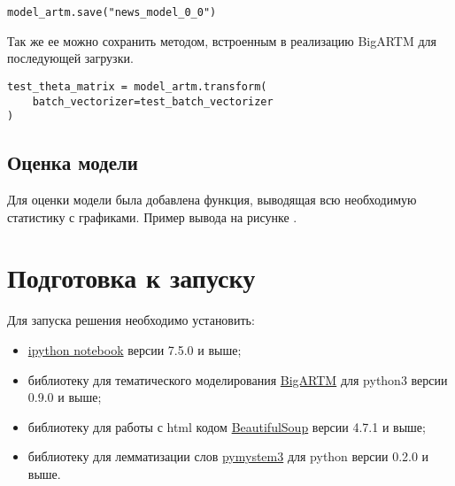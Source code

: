 \begin{lstlisting}
model_artm.save("news_model_0_0")
\end{lstlisting}

Так же ее можно сохранить методом, встроенным в реализацию BigARTM для последующей загрузки.

\begin{lstlisting}
test_theta_matrix = model_artm.transform(
    batch_vectorizer=test_batch_vectorizer
)
\end{lstlisting}

\subsection{Оценка модели}

Для оценки модели была добавлена функция, выводящая всю необходимую статистику с графиками. Пример вывода на рисунке \todo{}.

%
\section{Подготовка к запуску}

Для запуска решения необходимо установить:

\begin{itemize}
    \item \href{https://ipython.readthedocs.io/en/stable/}{ipython notebook} версии 7.5.0 и выше;
    \item библиотеку для тематического моделирования \href{https://bigartm.readthedocs.io/en/stable/installation/index.html}{BigARTM} для python3 версии 0.9.0 и выше;
    \item библиотеку для работы с html кодом \href{https://www.crummy.com/software/BeautifulSoup/}{BeautifulSoup} версии 4.7.1 и выше;
    \item библиотеку для лемматизации слов \href{https://pypi.org/project/pymystem3/}{pymystem3} для python версии 0.2.0 и выше.
\end{itemize}
